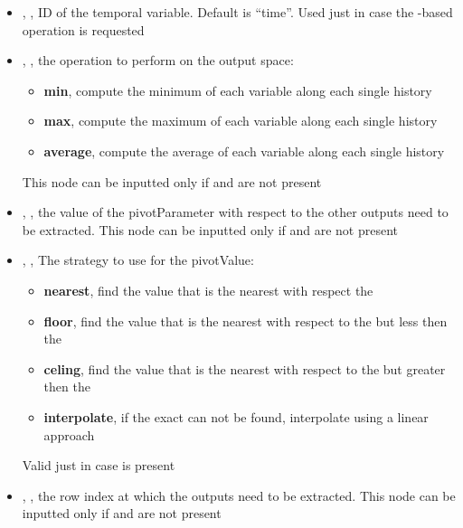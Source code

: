 \begin{itemize}
   \item {}, , ID of the temporal variable. Default is ``time''. 
   \nb Used just in case the  -based operation  is requested
    \item {}, , the operation to perform on the output space:
      \begin{itemize}
        \item \textbf{min}, compute the minimum of each variable along each single history
         \item \textbf{max}, compute the maximum of each variable along each single history
         \item \textbf{average}, compute the average of each variable along each single history
       \end{itemize}
        \nb This node can be inputted only if  and  are not present
     \item {}, , the value of the pivotParameter with respect to the other outputs need to be extracted.
       \nb This node can be inputted only if  and  are not present
     \item {}, , The strategy to use for the pivotValue:
       \begin{itemize}
        \item \textbf{nearest}, find the value that is the nearest with respect the 
        \item \textbf{floor}, find the value that is the nearest with respect to the  but less then the  
        \item \textbf{celing}, find the value that is the nearest with respect to the  but greater then the  
        \item \textbf{interpolate}, if the exact    can not be found, interpolate using a linear approach
       \end{itemize}
       
       \nb Valid just in case  is present
     \item {}, , the row index at which the outputs need to be extracted.
       \nb This node can be inputted only if  and  are not present   
\end{itemize}

